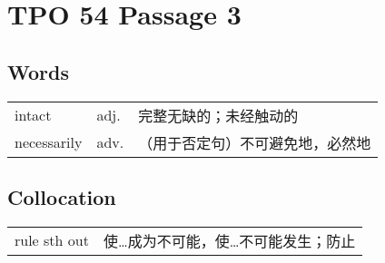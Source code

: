 \section{TPO 54 Passage 3}

\subsection{Words}

\begin{tabular}{lll}
    intact      & adj. & 完整无缺的；未经触动的      \\
    necessarily & adv. & （用于否定句）不可避免地，必然地 \\
\end{tabular}

\subsection{Collocation}

\begin{tabular}{ll}
    rule sth out & 使…成为不可能，使…不可能发生；防止 \\
\end{tabular}
